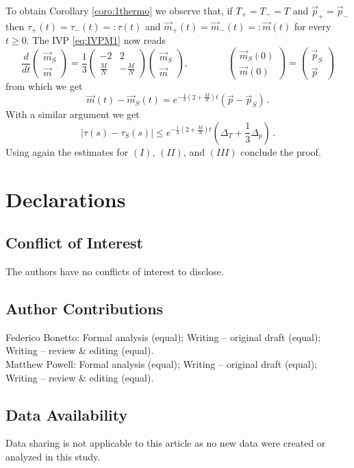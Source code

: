 \documentclass{article}
\begin{document}
To obtain Corollary \ref{coro:1thermo} we observe that, if $T_+=T_-=T$ and $\vec p_+=\vec p_-$ then 
$\tau_+(t)=\tau_-(t)=:\tau(t)$ and $\vec m_+(t)=\vec m_-(t)=:\vec m(t)$ for every $t\geq 0$. The IVP \eqref{eq:IVPM1} 
now reads
\[
\frac{d}{dt}\begin{pmatrix}
		 \vec m_S \\ \vec m
	\end{pmatrix}=
\frac 13\begin{pmatrix}
-2 & 2\\
\frac{M}{N} & -\frac MN
\end{pmatrix}
\begin{pmatrix}
	 \vec m_S \\ \vec m
	\end{pmatrix},
\qquad\qquad
\begin{pmatrix}
	 \vec m_S(0) \\ \vec m(0)
	\end{pmatrix}=
\begin{pmatrix}
	 \vec p_S \\ \vec p
	\end{pmatrix}
\]
from which we get
\[
\vec m(t)-\vec m_S(t)=e^{-\frac13\left(2+\frac MN\right)t}(\vec p-\vec p_S)\, .
\]
With a similar argument we get
\[
|\tau(s)-\tau_S(s)|\leq e^{-\frac13\left(2+\frac MN\right)t}\left(\Delta_T+\frac 13 \Delta_p\right)\, .
\]
Using again the estimates for $(I)$, $(II)$, and $(III)$ conclude the proof.

\section*{Declarations}

\subsection*{Conflict of Interest}
The authors have no conflicts of interest to disclose.

\subsection*{Author Contributions}
Federico Bonetto: Formal analysis (equal); Writing – original draft (equal); Writing – review \& editing (equal). \\
Matthew Powell: Formal analysis (equal); Writing – original draft (equal); Writing – review \& editing (equal).


\subsection*{Data Availability}
Data sharing is not applicable to this article as no new data were created or analyzed in this study.
\end{document}
